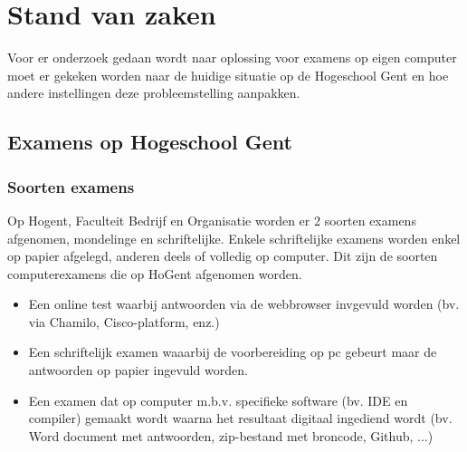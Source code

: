 \chapter{Stand van zaken}
\label{ch:stand-van-zaken}



Voor er onderzoek gedaan wordt naar oplossing voor examens op eigen computer moet er gekeken worden naar de huidige situatie op de Hogeschool Gent en hoe andere instellingen deze probleemstelling aanpakken. 

\section{Examens op Hogeschool Gent}

\subsection{Soorten examens}
Op Hogent, Faculteit Bedrijf en Organisatie worden er 2 soorten examens afgenomen, mondelinge en schriftelijke. Enkele schriftelijke examens worden enkel op papier afgelegd, anderen deels of volledig op computer. Dit zijn de soorten computerexamens die op HoGent afgenomen worden.
\begin{itemize}
\item Een online test waarbij antwoorden via de webbrowser invgevuld worden (bv. via Chamilo, Cisco-platform, enz.)
\item Een schriftelijk examen waaarbij de voorbereiding op pc gebeurt maar de antwoorden op papier ingevuld worden.
\item Een examen dat op computer m.b.v. specifieke software (bv. IDE en compiler) gemaakt wordt waarna het resultaat digitaal ingediend wordt (bv. Word document met antwoorden, zip-bestand met broncode, Github, ...)
\end{itemize}


